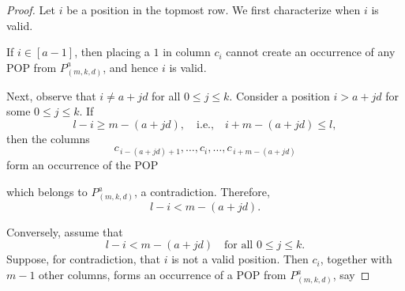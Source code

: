\documentclass[12pt, english, a4paper]{article}
\theoremstyle{plain}
\theoremstyle{definition}
\theoremstyle{remark}
\begin{document}
\begin{proof}
Let \(i\) be a position in the topmost row. We first characterize when \(i\) is valid.

If \(i \in [a-1]\), then placing a \(1\) in column \(c_i\) cannot create an occurrence of any POP from \(P^a_{(m,k,d)}\), and hence \(i\) is valid.

Next, observe that \(i \neq a+jd\) for all \(0 \le j \le k\). Consider a position \(i > a+jd\) for some \(0 \le j \le k\). If
\[
l - i \ge m - (a+jd),
\quad \text{i.e.,} \quad
i + m - (a+jd) \le l,
\]
then the columns
$$
c_{\,i-(a+jd)+1}, \ldots, c_i, \ldots, c_{\,i+m-(a+jd)}
$$
form an occurrence of the POP
which belongs to \(P^a_{(m,k,d)}\), a contradiction. Therefore,
\[
l - i < m - (a+jd).
\]

Conversely, assume that
\[
l - i < m - (a+jd) \quad \text{for all } 0 \le j \le k.
\]
Suppose, for contradiction, that \(i\) is not a valid position. Then \(c_i\), together with \(m-1\) other columns, forms an occurrence of a POP from \(P^a_{(m,k,d)}\), say
\end{proof}
\end{document}
